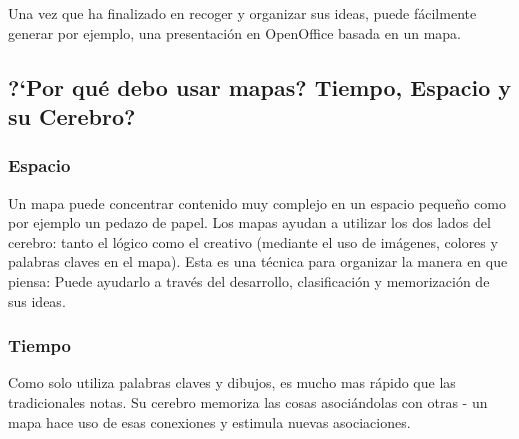 \documentclass{article}
\begin{document}
Una vez que ha finalizado en recoger y organizar sus ideas, puede f\'acilmente generar por ejemplo, una presentaci\'on en OpenOffice basada en un mapa.

\subsection{?`Por qu\'e debo usar mapas? Tiempo, Espacio y su Cerebro?}
\subsubsection*{Espacio}
Un mapa puede concentrar contenido muy complejo en un espacio peque\~no como por ejemplo un pedazo de papel. Los mapas ayudan a utilizar los dos lados del cerebro: tanto el l\'ogico como el creativo (mediante el uso de im\'agenes, colores y palabras claves en el mapa). Esta es una t\'ecnica para organizar la manera en que piensa: Puede ayudarlo a trav\'es del desarrollo, clasificaci\'on y memorizaci\'on de sus ideas.

\subsubsection*{Tiempo}
Como solo utiliza palabras claves y dibujos, es mucho mas r\'apido que las tradicionales notas. Su cerebro memoriza las cosas asoci\'andolas con otras - un mapa hace uso de esas conexiones y estimula nuevas asociaciones.
\end{document}
